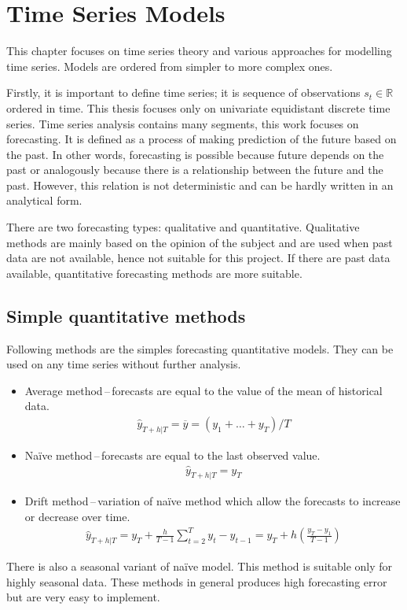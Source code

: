 \chapter{Time Series Models}
This chapter focuses on time series theory and various approaches for modelling time series.
Models are ordered from simpler to more complex ones. 

Firstly, it is important to define time series; it is sequence of observations
$s_t \in \mathbb{R}$ ordered in time. This thesis focuses only on univariate equidistant 
discrete time series. Time series analysis contains many segments, this work focuses on 
forecasting. It is defined as a process of making prediction of the future based 
on the past. In other words, forecasting is possible because  
future depends on the past or analogously because there is a relationship
between the future and the past. However, this relation is not deterministic and 
can be hardly written in an analytical form.

There are two forecasting types: qualitative and quantitative.
Qualitative methods are mainly based on the opinion of the subject and are used 
when past data are not available, hence not suitable for this project. 
If there are past data available, quantitative forecasting methods are more suitable. 

    \section{Simple quantitative methods}
    Following methods are the simples forecasting quantitative models. They can be used on
    any time series without further analysis. 

    \begin{itemize}
        \item Average method\,--\,forecasts are equal to the value of the mean of
            historical data.
            \begin{eqnarray}
                \hat{y}_{T+h|T} = \overline{y} = (y_{1}+ \dots + y_{T}) / T 
            \end{eqnarray}
        \item Na\"{i}ve method\,--\,forecasts are equal to the last observed value.
            \begin{eqnarray}
                \hat{y}_{T+h|T} = y_{T}
            \end{eqnarray}
        \item Drift method\,--\,variation of na\"{i}ve method which allow the
            forecasts to increase or decrease over time.
            \begin{eqnarray}
                \hat{y}_{T+h|T} = y_{T} + \frac{h}{T-1} \sum_{t=2}^T{y_{t} - y_{t-1}} = 
                    y_{T} + h(\frac{y_{T}-y_{1}}{T-1}) 
            \end{eqnarray}

    \end{itemize}
    There is also a seasonal variant of na\"{i}ve model. This method is suitable only
    for highly seasonal data. These methods in general produces high forecasting error 
    but are very easy to implement.

